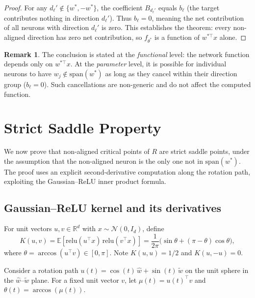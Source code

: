 \documentclass[11pt]{amsart}
\theoremstyle{definition}
\newtheorem{remark}[theorem]{Remark}
\newcommand{\R}{\mathbb{R}}
\newcommand{\E}{\mathbb{E}}
\newcommand{\relu}{\mathrm{relu}}
\newcommand{\spn}{\mathrm{span}}
\begin{document}
\begin{proof}
For any $d_\ell' \notin \{w^*, -w^*\}$, the coefficient $B_{d_\ell'}$ equals $b_\ell$ (the target contributes nothing in direction $d_\ell'$). Thus $b_\ell = 0$, meaning the net contribution of all neurons with direction $d_\ell'$ is zero. This establishes the theorem: every non-aligned direction has zero net contribution, so $f_{\theta^*}$ is a function of $w^{*\top}x$ alone.
\end{proof}

\begin{remark}\label{rem:functional}
The conclusion is stated at the \emph{functional} level: the network function depends only on $w^{*\top}x$. At the \emph{parameter} level, it is possible for individual neurons to have $w_j \notin \spn(w^*)$ as long as they cancel within their direction group ($b_\ell = 0$). Such cancellations are non-generic and do not affect the computed function.
\end{remark}

\section{Strict Saddle Property}\label{sec:saddle}

We now prove that non-aligned critical points of $R$ are strict saddle points,
under the assumption that the non-aligned neuron is the only one not in
$\spn(w^*)$.  The proof uses an explicit second-derivative computation along
the rotation path, exploiting the Gaussian--ReLU inner product formula.

\subsection{Gaussian--ReLU kernel and its derivatives}

For unit vectors $u, v \in \R^d$ with $x \sim \mathcal{N}(0, I_d)$, define
\begin{equation}\label{eq:kernel}
  K(u,v) = \E[\relu(u^\top x)\,\relu(v^\top x)]
  = \frac{1}{2\pi}\bigl(\sin\theta + (\pi - \theta)\cos\theta\bigr),
\end{equation}
where $\theta = \arccos(u^\top v) \in [0,\pi]$.  Note $K(u,u) = 1/2$ and
$K(u,-u) = 0$.

Consider a rotation path $u(t) = \cos(t)\,\hat{w} + \sin(t)\,\tilde{w}$
on the unit sphere in the $\hat{w}$--$\tilde{w}$ plane.  For a fixed unit
vector $v$, let $\mu(t) = u(t)^\top v$ and $\theta(t) = \arccos(\mu(t))$.
\end{document}
